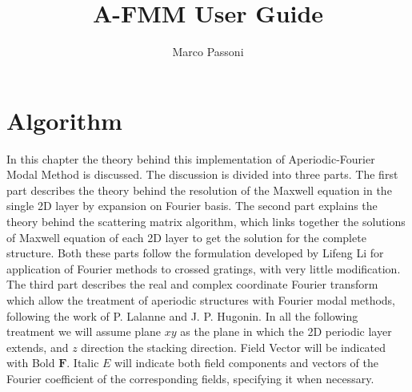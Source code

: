 \documentclass[a4paper,10pt]{report}
\title{A-FMM User Guide}
\author{Marco Passoni}
\date{}
\begin{document}
\maketitle


\chapter{Algorithm}
In this chapter the theory behind this implementation of Aperiodic-Fourier Modal Method is discussed. The discussion is divided into three parts. The first part describes the theory behind the resolution of the Maxwell equation in the single 2D layer by expansion on Fourier basis. The second part explains the theory behind the scattering matrix algorithm, which links together the solutions of Maxwell equation of each 2D layer to get the solution for the complete structure. Both these parts follow the formulation developed by Lifeng Li for application of Fourier methods to crossed gratings, with very little modification. The third part describes the real and complex coordinate Fourier transform which allow the treatment of aperiodic structures with Fourier modal methods, following the work of P. Lalanne and J. P. Hugonin. In all the following treatment we will assume plane $xy$ as the plane in which the 2D periodic layer extends, and $z$ direction the stacking direction. Field Vector will be indicated with Bold $\mathbf{F}$. Italic $E$ will indicate both field components and vectors of the Fourier coefficient of the corresponding fields, specifying it when necessary. 
\end{document}
